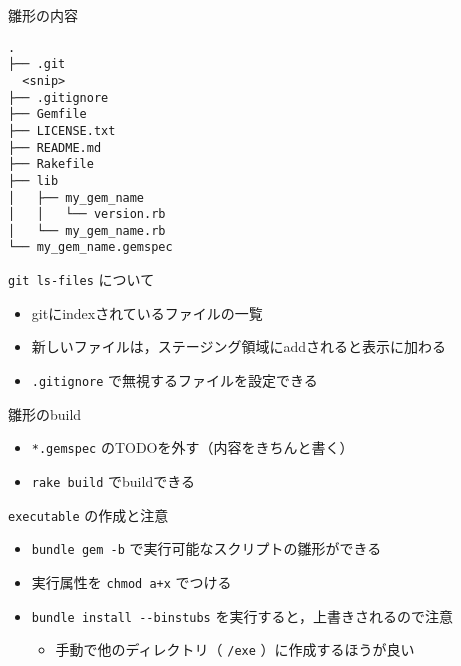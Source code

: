 \documentclass[t, aspectratio=169]{beamer}
\begin{document}
\begin{frame}[fragile,label=sec-4-3-2]{雛形の内容}
 \begin{verbatim}
.
├── .git
  <snip>
├── .gitignore
├── Gemfile
├── LICENSE.txt
├── README.md
├── Rakefile
├── lib
│   ├── my_gem_name
│   │   └── version.rb
│   └── my_gem_name.rb
└── my_gem_name.gemspec
\end{verbatim}
\end{frame}

\begin{frame}[fragile,label=sec-4-3-3]{\texttt{git ls-files} について}
 \begin{itemize}
\item gitにindexされているファイルの一覧
\item 新しいファイルは，ステージング領域にaddされると表示に加わる
\item \texttt{.gitignore} で無視するファイルを設定できる
\end{itemize}
\end{frame}

\begin{frame}[fragile,label=sec-4-3-4]{雛形のbuild}
 \begin{itemize}
\item \texttt{*.gemspec} のTODOを外す（内容をきちんと書く）
\item \texttt{rake build} でbuildできる
\end{itemize}
\end{frame}

\begin{frame}[fragile,label=sec-4-3-5]{\texttt{executable} の作成と注意}
 \begin{itemize}
\item \texttt{bundle gem -b} で実行可能なスクリプトの雛形ができる
\item 実行属性を \texttt{chmod a+x} でつける
\item \texttt{bundle install -{}-binstubs} を実行すると，上書きされるので注意
\begin{itemize}
\item 手動で他のディレクトリ（ \texttt{/exe} ）に作成するほうが良い
\end{itemize}
\end{itemize}
\end{frame}
\end{document}
